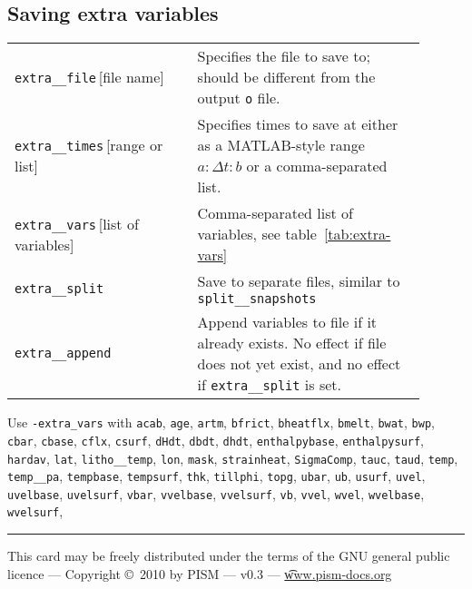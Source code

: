\documentclass[10pt,landscape]{article}
\newcommand{\und}{\_\!\_}
\begin{document}
\begin{multicols*}{3}
\section{Saving extra variables}

\begin{tabular}{@{}p{0.4\linewidth}p{0.5\linewidth}@{}}
   \texttt{extra\und file}\,[file name] & Specifies the file to save to; should be different from the output \texttt{o} file.\\
    \texttt{extra\und times}\,[range or list] & Specifies times to save at either as a MATLAB-style range $a:\Delta t:b$ or a comma-separated list.\\
    \texttt{extra\und vars}\,[list of variables]& Comma-separated list of variables, see table~\ref{tab:extra-vars}\\
    \texttt{extra\und split} & Save to separate files, similar to \texttt{split\und snapshots}\\
    \texttt{extra\und append} & Append variables to file if it already exists.  No effect if file does not yet exist, and no effect if \texttt{extra\und split} is set.
\end{tabular}




Use \verb|-extra_vars| with
    \texttt{acab}, 
    \texttt{age},
    \texttt{artm},
    \texttt{bfrict},
    \texttt{bheatflx},
    \texttt{bmelt},
    \texttt{bwat},
    \texttt{bwp},
    \texttt{cbar},
    \texttt{cbase},
    \texttt{cflx},
    \texttt{csurf},
    \texttt{dHdt},
    \texttt{dbdt},
    \texttt{dhdt},
    \texttt{enthalpybase},
    \texttt{enthalpysurf},
    \texttt{hardav},
    \texttt{lat},
    \texttt{litho\und temp},
    \texttt{lon},
    \texttt{mask},
    \texttt{strainheat},
    \texttt{SigmaComp},
    \texttt{tauc},
    \texttt{taud},
    \texttt{temp},
    \texttt{temp\und pa},
    \texttt{tempbase},
    \texttt{tempsurf},
    \texttt{thk},
    \texttt{tillphi},
    \texttt{topg},
    \texttt{ubar},
    \texttt{ub},
    \texttt{usurf},
    \texttt{uvel},
    \texttt{uvelbase},
   \texttt{uvelsurf},
    \texttt{vbar},
    \texttt{vvelbase},
    \texttt{vvelsurf},
    \texttt{vb},
    \texttt{vvel},
    \texttt{wvel},
    \texttt{wvelbase},
    \texttt{wvelsurf},



\end{multicols*}

\rule{0.3\linewidth}{0.25pt}
\scriptsize

This card may be freely distributed under the terms of the GNU general
public licence --- Copyright \copyright\ 2010 by PISM --- v0.3 --- \href{http://www.pism-docs.org}{\t{www.pism-docs.org}}
\end{document}
